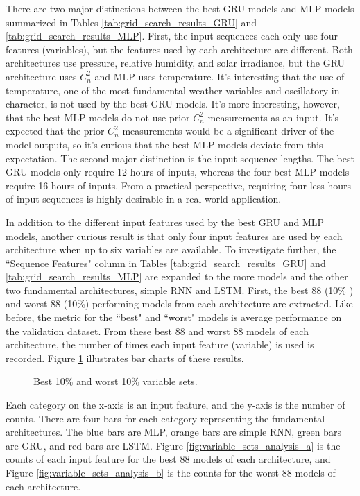 There are two major distinctions between the best GRU models and MLP models summarized in Tables \ref{tab:grid_search_results_GRU} and \ref{tab:grid_search_results_MLP}. First, the input sequences each only use four features (variables), but the features used by each architecture are different. Both architectures use pressure, relative humidity, and solar irradiance, but the GRU architecture uses $C_{n}^{2}$ and MLP uses temperature. It's interesting that the use of temperature, one of the most fundamental weather variables and oscillatory in character, is not used by the best GRU models. It's more interesting, however, that the best MLP models do not use prior $C_{n}^{2}$ measurements as an input. It's expected that the prior $C_{n}^{2}$ measurements would be a significant driver of the model outputs, so it's curious that the best MLP models deviate from this expectation. The second major distinction is the input sequence lengths. The best GRU models only require 12 hours of inputs, whereas the four best MLP models require 16 hours of inputs. From a practical perspective, requiring four less hours of input sequences is highly desirable in a real-world application.

In addition to the different input features used by the best GRU and MLP models, another curious result is that only four input features are used by each architecture when up to six variables are available. To investigate further, the ``Sequence Features" column in Tables \ref{tab:grid_search_results_GRU} and \ref{tab:grid_search_results_MLP} are expanded to the more models and the other two fundamental architectures, simple RNN and LSTM. First, the best 88 (10\% ) and worst 88 (10\%) performing models from each architecture are extracted. Like before, the metric for the ``best" and ``worst" models is average performance on the validation dataset. From these best 88 and worst 88 models of each architecture, the number of times each input feature (variable) is used is recorded. Figure \ref{fig:variable_sets_analysis} illustrates bar charts of these results.
\begin{figure}[h!]
	\centering
	\hfill
	\caption{Best 10\% and worst 10\% variable sets.}
	\label{fig:variable_sets_analysis}
\end{figure}
Each category on the x-axis is an input feature, and the y-axis is the number of counts. There are four bars for each category representing the fundamental architectures. The blue bars are MLP, orange bars are simple RNN, green bars are GRU, and red bars are LSTM. Figure \ref{fig:variable_sets_analysis_a} is the counts of each input feature for the best 88 models of each architecture, and Figure \ref{fig:variable_sets_analysis_b} is the counts for the worst 88 models of each architecture.


